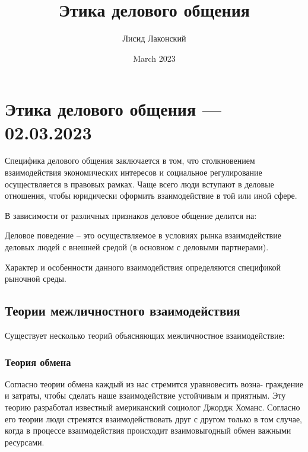 \documentclass[a4paper,14pt]{extarticle}
\title{Этика делового общения}
\author{Лисид Лаконский}
\date{March 2023}
\begin{document}
\raggedright

\maketitle
\tableofcontents
\pagebreak

\section{Этика делового общения — 02.03.2023}

Специфика делового общения заключается в том, что столкновением
взаимодействия экономических интересов и социальное регулирование осуществляется в правовых рамках. Чаще всего люди вступают в деловые отношения, чтобы юридически оформить взаимодействие в той или иной сфере.

В зависимости от различных признаков деловое общение делится на:

\begin{multienumerate}
\end{multienumerate}

Деловое поведение – это осуществляемое в условиях рынка взаимодействие деловых людей с внешней средой (в основном с деловыми партнерами).

Характер и особенности данного взаимодействия определяются спецификой рыночной среды.

\subsection{Теории межличностного взаимодействия}

Существует несколько теорий объясняющих межличностное взаимодействие:

\begin{multienumerate}
\end{multienumerate}

\subsubsection{Теория обмена}

Согласно теории обмена каждый из нас стремится уравновесить возна-
граждение и затраты, чтобы сделать наше взаимодействие устойчивым и приятным. Эту теорию разработал известный американский социолог Джордж Хоманс. Согласно его теории люди стремятся взаимодействовать друг с другом только в том случае, когда в процессе взаимодействия происходит взаимовыгодный обмен важными ресурсами.
\end{document}
